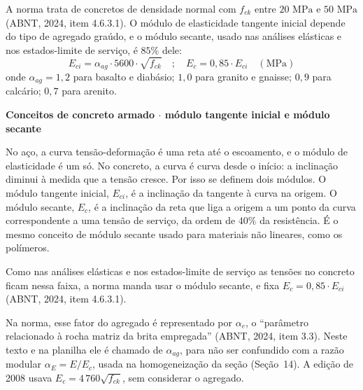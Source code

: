 \documentclass[11pt,a4paper]{article}
\newcommand{\caixaconceito}[2]{%
  \par\vspace{6pt}\noindent\colorbox{calloutbg}{%
    \parbox{\dimexpr\linewidth-2\fboxsep\relax}{%
      \vspace{4pt}\textbf{\color{primary}#1}\par\vspace{3pt}#2\vspace{4pt}%
    }%
  }\par\vspace{6pt}%
}
\begin{document}
A norma trata de concretos de densidade normal com $f_{ck}$ entre $20\text{ MPa}$ e $50\text{ MPa}$ (ABNT, 2024, item 4.6.3.1). O módulo de elasticidade tangente inicial depende do tipo de agregado graúdo, e o módulo secante, usado nas análises elásticas e nos estados-limite de serviço, é $85\%$ dele:
\begin{equation}
  E_{ci} = \alpha_{ag} \cdot 5600 \cdot \sqrt{f_{ck}} \quad ; \quad E_c = 0{,}85 \cdot E_{ci} \quad (\text{MPa})
  \label{eq:ec}
\end{equation}
onde $\alpha_{ag} = 1{,}2$ para basalto e diabásio; $1{,}0$ para granito e gnaisse; $0{,}9$ para calcário; $0{,}7$ para arenito.

\caixaconceito{Conceitos de concreto armado $\cdot$ módulo tangente inicial e módulo secante}{%
No aço, a curva tensão-deformação é uma reta até o escoamento, e o módulo de elasticidade é um só. No concreto, a curva é curva desde o início: a inclinação diminui à medida que a tensão cresce. Por isso se definem dois módulos. O módulo tangente inicial, $E_{ci}$, é a inclinação da tangente à curva na origem. O módulo secante, $E_c$, é a inclinação da reta que liga a origem a um ponto da curva correspondente a uma tensão de serviço, da ordem de $40\%$ da resistência. É o mesmo conceito de módulo secante usado para materiais não lineares, como os polímeros.\par\vspace{4pt}
Como nas análises elásticas e nos estados-limite de serviço as tensões no concreto ficam nessa faixa, a norma manda usar o módulo secante, e fixa $E_c = 0{,}85\cdot E_{ci}$ (ABNT, 2024, item 4.6.3.1).}

Na norma, esse fator do agregado é representado por $\alpha_e$, o ``parâmetro relacionado à rocha matriz da brita empregada'' (ABNT, 2024, item 3.3). Neste texto e na planilha ele é chamado de $\alpha_{ag}$, para não ser confundido com a razão modular $\alpha_E = E/E_c$, usada na homogeneização da seção (Seção~14). A edição de 2008 usava $E_c = 4\,760\sqrt{f_{ck}}$, sem considerar o agregado.
\end{document}
